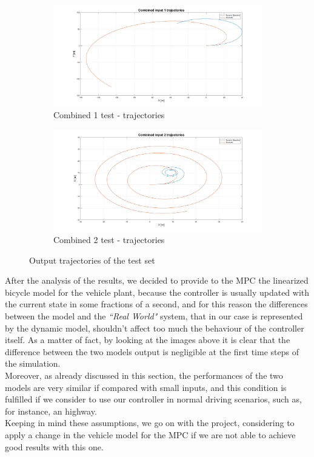 \begin{figure}[H]
    \begin{subfigure}{.5\textwidth}
    \centering
  \includegraphics[width=1.1\textwidth,keepaspectratio]{Figures/Comb1_traj.png}
    \caption{Combined 1 test - trajectories}
    \label{subfig:Comb_1}
    \end{subfigure}%
    \begin{subfigure}{.5\textwidth}
    \centering
  \includegraphics[width=1.1\textwidth,keepaspectratio]{Figures/Comb2_traj.png}
    \caption{Combined 2 test - trajectories}
    \label{subfig:Comb_2}
    \end{subfigure}
    
    \caption{Output trajectories of the test set}
    \label{fig:trajectories}
\end{figure}
\pagebreak


After the analysis of the results, we decided to provide to the MPC the linearized bicycle model for the vehicle plant, because the controller is usually updated with the current state in some fractions of a second, and for this reason the differences between the model and the \textit{``Real World"} system, that in our case is represented by the dynamic model, shouldn't affect too much the behaviour of the controller itself. As a matter of fact, by looking at the images above it is clear that the difference between the two models output is negligible at the first time steps of the simulation.\\
Moreover, as already discussed in this section, the performances of the two models are very similar if compared with small inputs, and this condition is fulfilled if we consider to use our controller in normal driving scenarios, such as, for instance, an highway.\\
Keeping in mind these assumptions, we go on with the project, considering to apply a change in the vehicle model for the MPC if we are not able to achieve good results with this one.